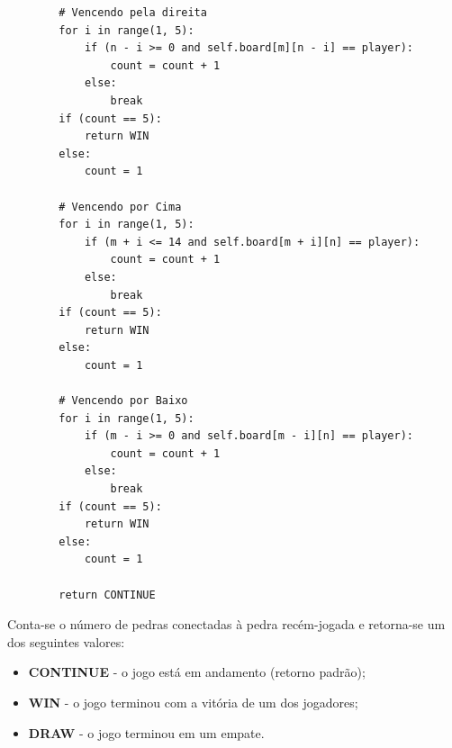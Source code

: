\documentclass[10pt,a4paper]{article}
\begin{document}
\begin{verbatim}
        # Vencendo pela direita
        for i in range(1, 5):
            if (n - i >= 0 and self.board[m][n - i] == player):
                count = count + 1
            else:
                break
        if (count == 5):
            return WIN
        else:
            count = 1

        # Vencendo por Cima
        for i in range(1, 5):
            if (m + i <= 14 and self.board[m + i][n] == player):
                count = count + 1
            else:
                break
        if (count == 5):
            return WIN
        else:
            count = 1

        # Vencendo por Baixo
        for i in range(1, 5):
            if (m - i >= 0 and self.board[m - i][n] == player):
                count = count + 1
            else:
                break
        if (count == 5):
            return WIN
        else:
            count = 1

        return CONTINUE
\end{verbatim}

Conta-se o número de pedras conectadas à pedra recém-jogada e retorna-se um dos seguintes valores:
%
\begin{itemize}
    \item \textbf{CONTINUE} - o jogo está em andamento (retorno padrão);
    \item \textbf{WIN} - o jogo terminou com a vitória de um dos jogadores;
    \item \textbf{DRAW} - o jogo terminou em um empate.
\end{itemize}








\end{document}
